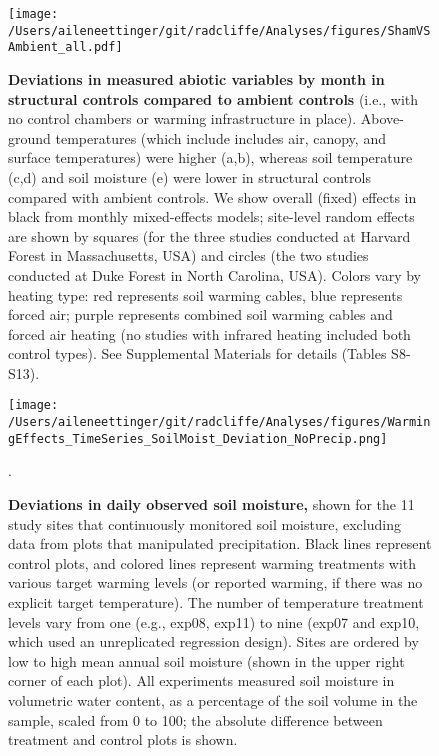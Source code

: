 \documentclass{article}
\begin{document}
 \begin{figure}[p]
\centering
\texttt{[image: /Users/aileneettinger/git/radcliffe/Analyses/figures/ShamVSAmbient\_all.pdf]} 
 \caption{\textbf{Deviations in measured abiotic variables by month in structural controls compared to ambient controls} (i.e., with no control chambers or warming infrastructure in place). Above-ground temperatures (which include includes air, canopy, and surface temperatures) were higher (a,b), whereas soil temperature (c,d) and soil moisture (e) were lower in structural controls compared with ambient controls. We show overall (fixed) effects in black from monthly mixed-effects models; site-level random effects are shown by squares (for the three studies conducted at Harvard Forest in Massachusetts, USA) and circles (the two studies conducted at Duke Forest in North Carolina, USA). Colors vary by heating type: red represents soil warming cables, blue represents forced air; purple represents combined soil warming cables and forced air heating (no studies with infrared heating included both control types). See Supplemental Materials for details (Tables S8-S13). }
 \label{fig:shamamb}
 \end{figure}
\clearpage
 \begin{figure}[h]
 \centering
 \texttt{[image: /Users/aileneettinger/git/radcliffe/Analyses/figures/WarmingEffects\_TimeSeries\_SoilMoist\_Deviation\_NoPrecip.png]} 
 \caption{\textbf{Deviations in daily observed soil moisture,} shown for the 11 study sites that continuously monitored soil moisture, excluding data from plots that manipulated precipitation. Black lines represent control plots, and colored lines represent warming treatments with various target warming levels (or reported warming, if there was no explicit target temperature). The number of temperature treatment levels vary from one (e.g., exp08, exp11) to nine (exp07 and exp10, which used an unreplicated regression design). Sites are ordered by low to high mean annual soil moisture (shown in the upper right corner of each plot). All experiments measured soil moisture in volumetric water content, as a percentage of the soil volume in the sample, scaled from 0 to 100; the absolute difference between treatment and control plots is shown.}. 
 \label{fig:mois}
 \end{figure}
 
\end{document}
